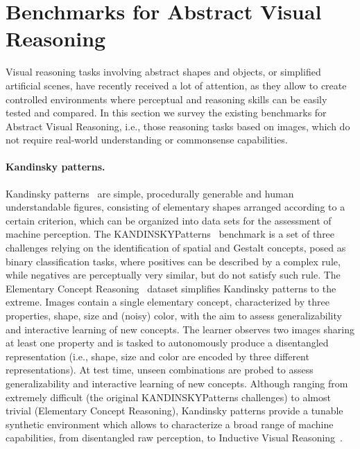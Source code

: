 \fi

\section{Benchmarks for Abstract Visual Reasoning}
Visual reasoning tasks involving abstract shapes and objects, or simplified artificial scenes, have recently received a lot of attention, as they allow to create controlled environments where perceptual and reasoning skills can be easily tested and compared. In this section we survey the existing benchmarks for Abstract Visual Reasoning, i.e., those reasoning tasks based on images, which do not require real-world understanding or commonsense capabilities. 

\paragraph{Kandinsky patterns.}
Kandinsky patterns~\cite{muller2021kandinsky} are simple, procedurally generable and human understandable figures, consisting of elementary shapes arranged according to a certain criterion, which can be organized into data sets for the assessment of machine perception.
%
The KANDINSKYPatterns~\cite{holzinger2021kandinskypatterns} benchmark is a set of three challenges relying on the identification of spatial and Gestalt concepts, posed as binary classification tasks, where positives can be described by a complex rule, while negatives are perceptually very similar, but do not satisfy such rule.
%
The Elementary Concept Reasoning~\cite{stammer2022interactive} dataset simplifies Kandinsky patterns to the extreme. Images contain a single elementary concept, characterized by three properties, shape, size and (noisy) color, with the aim to assess generalizability and interactive learning of new concepts. The learner observes two images sharing at least one property and is tasked to autonomously produce a disentangled representation (i.e., shape, size and color are encoded by three different representations). At test time, unseen combinations are probed to assess generalizability and interactive learning of new concepts.
%
Although ranging from extremely difficult (the original KANDINSKYPatterns challenges) to almost trivial (Elementary Concept Reasoning), Kandinsky patterns provide a tunable synthetic environment which allows to characterize a broad range of machine capabilities, from disentangled raw perception, to Inductive Visual Reasoning~\cite{shindo2023ailp}.

\iffalse
